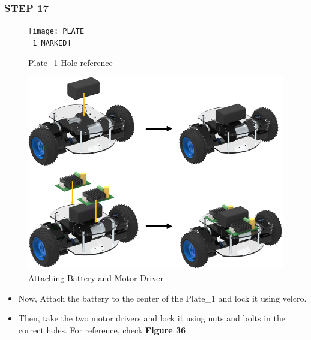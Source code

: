 \documentclass[12pt,a4paper,oneside]{book}
\begin{document}
			\subsubsection*{STEP 17}
				\begin{figure}[H]
					\begin{center}
						\texttt{[image: PLATE\\\_1 MARKED]}
						\caption{Plate\_1 Hole reference}
						\includegraphics[scale=0.6]{ATTACHING BATTERY AND MOTOR DRIVER}
						\caption{Attaching Battery and Motor Driver}
					\end{center}
				\end{figure}
				\begin{itemize}
					\item Now, Attach the battery to the center of the Plate\_1 and lock it using velcro.
					\item Then, take the two motor drivers and lock it using nuts and bolts in the correct holes. For reference, check \textbf{Figure 36}
				\end{itemize}
				
\end{document}
